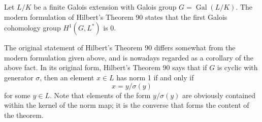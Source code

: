 \documentclass{article}
\begin{document}
Let $L/K$ be a finite Galois extension with Galois group $G = \operatorname{Gal}(L/K)$. The modern formulation of Hilbert's Theorem 90 states that the first Galois cohomology group $H^1(G, L^*)$ is 0.

The original statement of Hilbert's Theorem 90 differs somewhat from the modern formulation given above, and is nowadays regarded as a corollary of the above fact. In its original form, Hilbert's Theorem 90 says that if $G$ is cyclic with generator $\sigma$, then an element $x \in L$ has norm 1 if and only if
$$
x = y/\sigma(y)
$$
for some $y \in L$. Note that elements of the form $y/\sigma(y)$ are obviously contained within the kernel of the norm map; it is the converse that forms the content of the theorem.
\end{document}
